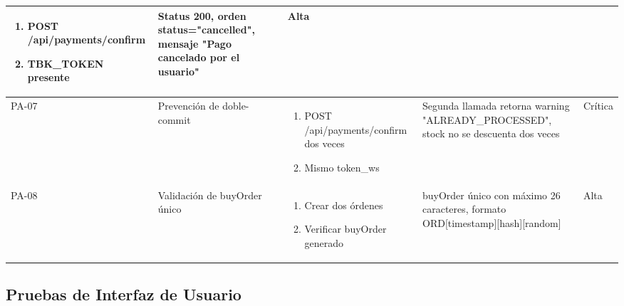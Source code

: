 \documentclass[12pt,a4paper]{article}
\begin{document}
\begin{longtable}{|p{1cm}|p{3cm}|p{4cm}|p{3cm}|p{3cm}|}
\begin{enumerate}[leftmargin=*,nosep]
    \item POST /api/payments/confirm
    \item TBK\_TOKEN presente
\end{enumerate} &
Status 200, orden status="cancelled", mensaje "Pago cancelado por el usuario" & Alta \\
\hline
PA-07 & Prevención de doble-commit &
\begin{enumerate}[leftmargin=*,nosep]
    \item POST /api/payments/confirm dos veces
    \item Mismo token\_ws
\end{enumerate} &
Segunda llamada retorna warning "ALREADY\_PROCESSED", stock no se descuenta dos veces & Crítica \\
\hline
PA-08 & Validación de buyOrder único &
\begin{enumerate}[leftmargin=*,nosep]
    \item Crear dos órdenes
    \item Verificar buyOrder generado
\end{enumerate} &
buyOrder único con máximo 26 caracteres, formato ORD[timestamp][hash][random] & Alta \\
\hline
\end{longtable}

\subsection{Pruebas de Interfaz de Usuario}
\end{document}

